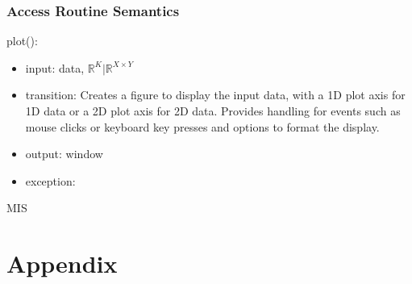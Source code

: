 \documentclass[12pt, titlepage]{article}
\begin{document}
\subsubsection{Access Routine Semantics}

\noindent plot():
\begin{itemize}
    \item input: data, $\mathbb{R}^{K} | \mathbb{R}^{X \times Y}$
    \item transition: Creates a figure to display the input data, with a 1D plot axis for 1D data or a 2D plot axis for 2D data. Provides handling for events such as mouse clicks or keyboard key presses and options to format the display.
    \item output: window
    \item exception:
\end{itemize}

\newpage

 {MIS}

\newpage

\section{Appendix} \label{Appendix}

\end{document}
